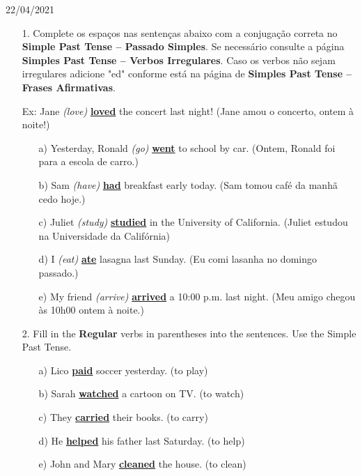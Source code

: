 \documentclass{SchoolBook}
\begin{document}
    \begin{day}{22/04/2021}
        \begin{enumerate}
            \item[1.] Complete os espaços nas sentenças abaixo com a conjugação correta no \textbf{Simple Past Tense -- Passado Simples}.
            Se necessário consulte a página \textbf{Simples Past Tense -- Verbos Irregulares}.
            Caso os verbos não sejam irregulares adicione "ed" conforme está na página de \textbf{Simples Past Tense -- Frases Afirmativas}.

            Ex: Jane \emph{(love)} \underline{\bf loved} the concert last night! (Jane amou o concerto, ontem à noite!)
            \begin{enumerate}
                \item[a)] Yesterday, Ronald \emph{(go)} \underline{\bf went} to school by car. (Ontem, Ronald foi para a escola de carro.)
                \item[b)] Sam \emph{(have)} \underline{\bf had} breakfast early today. (Sam tomou café da manhã cedo hoje.)
                \item[c)] Juliet \emph{(study)} \underline{\bf studied} in the University of California. (Juliet estudou na Universidade da Califórnia)
                \item[d)] I \emph{(eat)} \underline{\bf ate} lasagna last Sunday. (Eu comi lasanha no domingo passado.)
                \item[e)] My friend \emph{(arrive)} \underline{\bf arrived} a 10:00 p.m. last night. (Meu amigo chegou às 10h00 ontem à noite.) 
            \end{enumerate}

            \item[2.] Fill in the \textbf{Regular} verbs in parentheses into the sentences. Use the Simple Past Tense.
            \begin{enumerate}
                \item[a)] Lico \underline{\bf paid} soccer yesterday. (to play)
                \item[b)] Sarah \underline{\bf watched} a cartoon on TV. (to watch)
                \item[c)] They \underline{\bf carried} their books. (to carry)
                \item[d)] He \underline{\bf helped} his father last Saturday. (to help)
                \item[e)] John and Mary \underline{\bf cleaned} the house. (to clean)
            \end{enumerate}


\end{enumerate}
\end{day}
\end{document}
